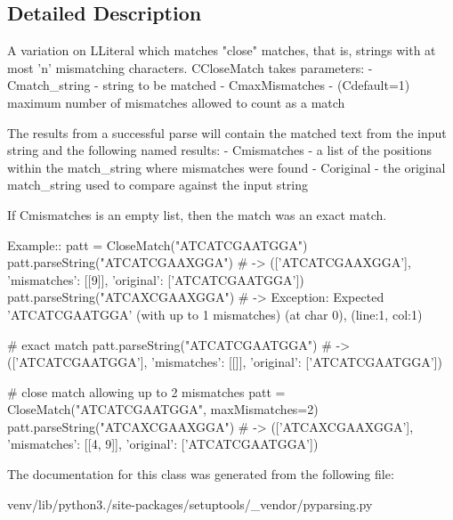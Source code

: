 \subsection{Detailed Description}
\begin{DoxyVerb}A variation on L{Literal} which matches "close" matches, that is, 
strings with at most 'n' mismatching characters. C{CloseMatch} takes parameters:
 - C{match_string} - string to be matched
 - C{maxMismatches} - (C{default=1}) maximum number of mismatches allowed to count as a match

The results from a successful parse will contain the matched text from the input string and the following named results:
 - C{mismatches} - a list of the positions within the match_string where mismatches were found
 - C{original} - the original match_string used to compare against the input string

If C{mismatches} is an empty list, then the match was an exact match.

Example::
    patt = CloseMatch("ATCATCGAATGGA")
    patt.parseString("ATCATCGAAXGGA") # -> (['ATCATCGAAXGGA'], {'mismatches': [[9]], 'original': ['ATCATCGAATGGA']})
    patt.parseString("ATCAXCGAAXGGA") # -> Exception: Expected 'ATCATCGAATGGA' (with up to 1 mismatches) (at char 0), (line:1, col:1)

    # exact match
    patt.parseString("ATCATCGAATGGA") # -> (['ATCATCGAATGGA'], {'mismatches': [[]], 'original': ['ATCATCGAATGGA']})

    # close match allowing up to 2 mismatches
    patt = CloseMatch("ATCATCGAATGGA", maxMismatches=2)
    patt.parseString("ATCAXCGAAXGGA") # -> (['ATCAXCGAAXGGA'], {'mismatches': [[4, 9]], 'original': ['ATCATCGAATGGA']})
\end{DoxyVerb}
 

The documentation for this class was generated from the following file\+:\begin{DoxyCompactItemize}
\item 
venv/lib/python3./site-\/packages/setuptools/\+\_\+vendor/pyparsing.\+py\end{DoxyCompactItemize}

